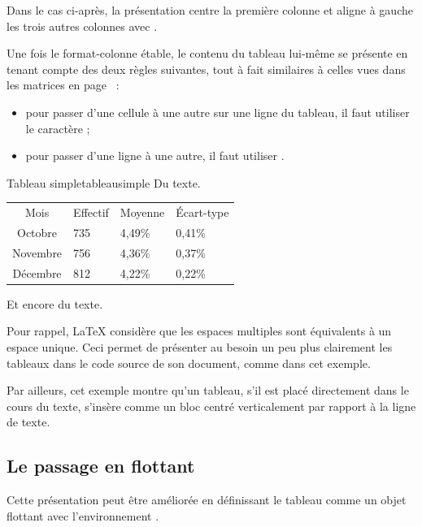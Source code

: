Dans le cas ci-après, la présentation centre la première colonne et aligne à gauche les trois autres colonnes avec .

Une fois le format-colonne étable, le contenu du tableau lui-même se présente en tenant compte des  deux règles suivantes, tout à fait similaires à celles vues dans les matrices en page~\pageref{matrice} :
\begin{itemize}
\item pour passer d'une cellule à une autre sur une ligne du tableau, il faut utiliser le caractère \macron{\&} ;
\item pour passer d'une ligne à une autre, il faut utiliser \macro{\ba}.
\end{itemize}

\begin{codedouble}{Tableau simple}{tableausimple}
Du texte.
\begin{tabular}{clll}
Mois            & Effectif     & Moyenne      & \'{E}cart-type  \\ 
Octobre         & 735          & 4,49\%       & 0,41\%          \\
Novembre        & 756          & 4,36\%       & 0,37\%          \\
Décembre        & 812          & 4,22\%       & 0,22\%          \\ 
\end{tabular}
Et encore du texte.
\end{codedouble}

Pour rappel, \LaTeX{} considère que les espaces multiples sont équivalents à un espace unique. Ceci permet de présenter au besoin un peu plus clairement les tableaux dans le code source de son document, comme dans cet exemple.

Par ailleurs, cet exemple montre qu'un tableau, s'il est placé directement dans le cours du texte, s'insère comme un bloc centré verticalement par rapport à la ligne de texte.

\subsection{Le passage en flottant}
\label{flottants}
Cette présentation peut être améliorée en définissant le tableau comme un objet flottant avec l'environnement .

